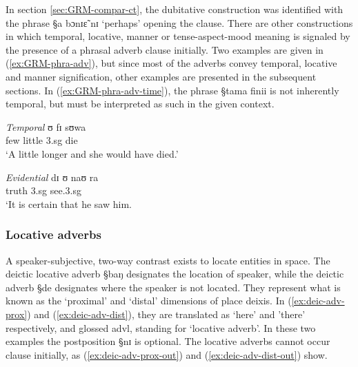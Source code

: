In section \ref{sec:GRM-compar-ct}, the dubitative construction was identified 
with the phrase {\S a bɔnɪɛ̃ nɪ} `perhaps'  opening the clause. There are other
constructions in which temporal, locative, manner or tense-aspect-mood meaning 
is signaled by the presence of a phrasal adverb clause initially. Two examples
are given in (\ref{ex:GRM-phra-adv}),  but since most of the adverbs convey
temporal, locative and manner signification, other examples are presented in
the subsequent sections. In (\ref{ex:GRM-phra-adv-time}), the phrase {\S tama
finii} is not inherently temporal, but must be interpreted as such in the given
context. 


\begin{exe}
\ex\label{ex:GRM-phra-adv}
\begin{xlist}

\ex\label{ex:GRM-phra-adv-time}{\it Temporal}
 ʊ fɪ sʊwa\\
few little {\sc 3.sg} {\mod} die\\
\glt `A little longer and she would  have died.'


\ex\label{ex:GRM-phra-adv-}{\it Evidential}
\gll [wɪdɪɪŋ na] dɪ ʊ naʊ ra\\
truth {\foc} {\comp} {\sc 3.sg} see.{\sc 3.sg} {\foc} \\
\glt  `It is certain that he saw him.


\end{xlist}
\end{exe}

\subsubsection{Locative adverbs}
\label{sec:GRM-deic-adv}


A speaker-subjective,  two-way contrast  exists to locate entities in space. The
deictic locative adverb {\S baŋ} designates the location of speaker, while 
the deictic adverb {\S de} designates  where the
speaker is not located. They represent what is known as the `proximal' and
`distal' 
dimensions of  place deixis. In (\ref{ex:deic-adv-prox}) and
(\ref{ex:deic-adv-dist}),  they are translated as `here' and 'there'
respectively, and glossed {\sc advl}, standing for `locative adverb'. In these
two examples  the postposition {\S nɪ} is optional.  The locative
adverbs cannot occur clause initially, as  (\ref{ex:deic-adv-prox-out})  and
  (\ref{ex:deic-adv-dist-out}) show. 


